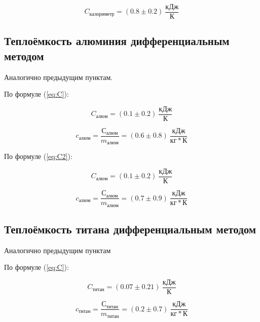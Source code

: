 \documentclass[a4paper, 12pt]{article}
\begin{document}
                \begin{equation*}
                    C_{калориметр} = (0.8 \pm 0.2)~\frac{кДж}{К}
                \end{equation*}

            \subsection{Теплоёмкость алюминия дифференциальным методом}

                Аналогично предыдущим пунктам.

                По формуле (\ref{eq:C}):

                \begin{equation*}
                    C_{алюм} = (0.1 \pm 0.2)~\frac{кДж}{К}
                \end{equation*}

                \begin{equation*}
                    c_{алюм} = \frac{С_{алюм}}{m_{алюм}} = (0.6 \pm 0.8)~\frac{кДж}{кг*К}
                \end{equation*}

                По формуле (\ref{eq:C2}):

                \begin{equation*}
                    C_{алюм} = (0.1 \pm 0.2)~\frac{кДж}{К}
                \end{equation*}

                \begin{equation*}
                    c_{алюм} = \frac{С_{алюм}}{m_{алюм}} = (0.7 \pm 0.9)~\frac{кДж}{кг*К}
                \end{equation*}

            \subsection{Теплоёмкость титана дифференциальным методом}

                Аналогично предыдущим пунктам

                По формуле (\ref{eq:C}):

                \begin{equation*}
                    C_{титан} = (0.07 \pm 0.21)~\frac{кДж}{К}
                \end{equation*}

                \begin{equation*}
                    c_{титан} = \frac{С_{титан}}{m_{титан}} = (0.2 \pm 0.7)~\frac{кДж}{кг*К}
                \end{equation*}
\end{document}
